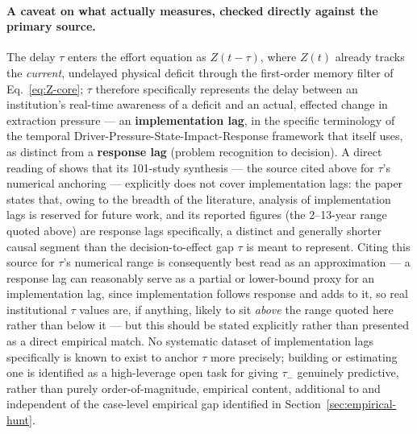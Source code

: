 \documentclass[twocolumn,10pt]{article}
\begin{document}
\paragraph{A caveat on what \cite{hocherman2025} actually measures, checked directly against the primary source.} The delay $\tau$ enters the effort equation as $Z(t-\tau)$, where $Z(t)$ already tracks the \emph{current}, undelayed physical deficit through the first-order memory filter of Eq.~\eqref{eq:Z-core}; $\tau$ therefore specifically represents the delay between an institution's real-time awareness of a deficit and an actual, effected change in extraction pressure --- an \textbf{implementation lag}, in the specific terminology of the temporal Driver-Pressure-State-Impact-Response framework that \cite{hocherman2025} itself uses, as distinct from a \textbf{response lag} (problem recognition to decision). A direct reading of \cite{hocherman2025} shows that its 101-study synthesis --- the source cited above for $\tau$'s numerical anchoring --- explicitly does not cover implementation lags: the paper states that, owing to the breadth of the literature, analysis of implementation lags is reserved for future work, and its reported figures (the 2--13-year range quoted above) are response lags specifically, a distinct and generally shorter causal segment than the decision-to-effect gap $\tau$ is meant to represent. Citing this source for $\tau$'s numerical range is consequently best read as an approximation --- a response lag can reasonably serve as a partial or lower-bound proxy for an implementation lag, since implementation follows response and adds to it, so real institutional $\tau$ values are, if anything, likely to sit \emph{above} the range quoted here rather than below it --- but this should be stated explicitly rather than presented as a direct empirical match. No systematic dataset of implementation lags specifically is known to exist to anchor $\tau$ more precisely; building or estimating one is identified as a high-leverage open task for giving $\tau_-$ genuinely predictive, rather than purely order-of-magnitude, empirical content, additional to and independent of the case-level empirical gap identified in Section~\ref{sec:empirical-hunt}.
\end{document}
